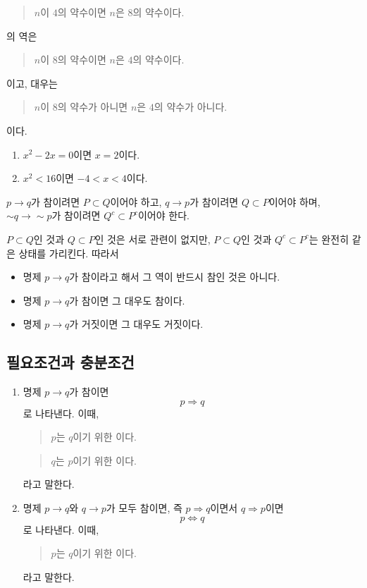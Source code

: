 \documentclass{oblivoir}
\begin{document}
%
\exam{}
\begin{quote}\label{pq7}
\(n\)이 \(4\)의 약수이면 \(n\)은 \(8\)의 약수이다.
\end{quote}
의 역은
\begin{quote}
\(n\)이 \(8\)의 약수이면 \(n\)은 \(4\)의 약수이다.
\end{quote}
이고, 대우는
\begin{quote}
\(n\)이 \(8\)의 약수가 아니면 \(n\)은 \(4\)의 약수가 아니다.
\end{quote}
이다.

%
\begin{enumerate}\label{pq8}
\item
\(x^2-2x=0\)이면 \(x=2\)이다.
\item
\(x^2<16\)이면 \(-4<x<4\)이다.
\end{enumerate}

\bigskip
\(p\to q\)가 참이려면 \(P\subset Q\)이어야 하고, 
\(q\to p\)가 참이려면 \(Q\subset P\)이어야 하며, 
\(\sim q\to\sim p\)가 참이려면 \(Q^c\subset P^c\)이어야 한다.

\(P\subset Q\)인 것과 \(Q\subset P\)인 것은 서로 관련이 없지만, \(P\subset Q\)인 것과 \(Q^c\subset P^c\)는 완전히 같은 상태를 가리킨다.
따라서
\begin{mdframed}
%
\theo{}
\begin{itemize}\label{pq9}
\item
명제 \(p\to q\)가 참이라고 해서 그 역이 반드시 참인 것은 아니다.
\item
명제 \(p\to q\)가 참이면 그 대우도 참이다.
\item
명제 \(p\to q\)가 거짓이면 그 대우도 거짓이다.
\end{itemize}
\end{mdframed}

\newpage
\subsection{필요조건과 충분조건}

\begin{mdframed}
%
\begin{enumerate}
\item
명제 \(p\to q\)가 참이면 \[p\Longrightarrow q\]로 나타낸다.
이때,
\begin{quote}
\(p\)는 \(q\)이기 위한 이다.
\end{quote}
\begin{quote}
\(q\)는 \(p\)이기 위한 이다.
\end{quote}
라고 말한다.
\item
명제 \(p\to q\)와 \(q\to p\)가 모두 참이면, 즉  \(p\Longrightarrow q\)이면서 \(q\Longrightarrow p\)이면
\[p\iff q\]로 나타낸다.
이때,
\begin{quote}
\(p\)는 \(q\)이기 위한 이다.\footnotemark
\end{quote}
라고 말한다.
\end{enumerate}
\end{mdframed}
\end{document}
